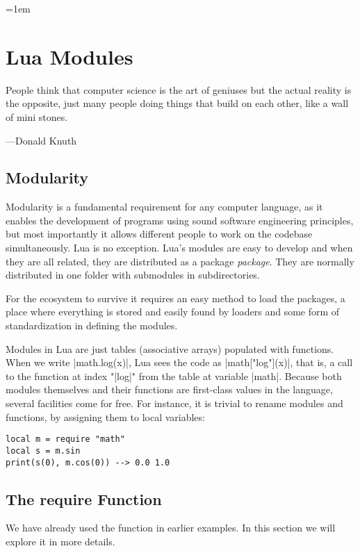 
\newfontfamily{}
\def\texthiero#1{{\color{black!95}\hiero #1}}
\parindent=1em   

\chapter{Lua Modules}

\epigraph{People think that computer science is the art of geniuses but the actual reality is the opposite, just many people doing things that build on each other, like a wall of mini stones.}{---Donald Knuth}


\section{Modularity}

Modularity is a fundamental requirement for any computer language, as it enables the development of programs using sound software engineering principles, but most importantly it allows different people to work on the codebase simultaneously. Lua is no exception. Lua's modules are easy to develop and when they are all related, they are distributed as a package \textit{package}. They are normally distributed in one folder with submodules in subdirectories. 

For the ecosystem to survive it requires an easy method to load the packages, a place where everything is stored and easily found by loaders and some form of standardization in defining the modules. 

Modules in Lua are just tables (associative arrays) populated with functions.
When we write |math.log(x)|, Lua sees the code as |math["log"](x)|, that is, a
call to the function at index "|log|" from the table at variable |math|.
Because both modules themselves and their functions are first-class values in
the language, several facilities come for free. For instance, it is trivial to rename
modules and functions, by assigning them to local variables:
\begin{verbatim}
local m = require "math"
local s = m.sin
print(s(0), m.cos(0)) --> 0.0 1.0
\end{verbatim}

\section{The require Function}
\label{sec:require}

We have already used the  function in earlier examples. In this section we will explore it in more details.

